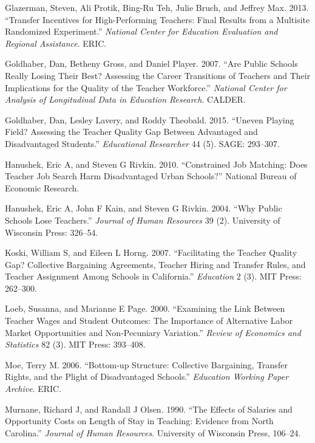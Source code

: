 \documentclass[]{article}
\begin{document}
\hypertarget{ref-glazerman}{}
Glazerman, Steven, Ali Protik, Bing-Ru Teh, Julie Bruch, and Jeffrey
Max. 2013. ``Transfer Incentives for High-Performing Teachers: Final
Results from a Multisite Randomized Experiment.'' \emph{National Center
for Education Evaluation and Regional Assistance}. ERIC.

\hypertarget{ref-goldhaber2007}{}
Goldhaber, Dan, Betheny Gross, and Daniel Player. 2007. ``Are Public
Schools Really Losing Their Best? Assessing the Career Transitions of
Teachers and Their Implications for the Quality of the Teacher
Workforce.'' \emph{National Center for Analysis of Longitudinal Data in
Education Research}. CALDER.

\hypertarget{ref-goldhaber2015}{}
Goldhaber, Dan, Lesley Lavery, and Roddy Theobald. 2015. ``Uneven
Playing Field? Assessing the Teacher Quality Gap Between Advantaged and
Disadvantaged Students.'' \emph{Educational Researcher} 44 (5). SAGE:
293--307.

\hypertarget{ref-hanushek2010}{}
Hanushek, Eric A, and Steven G Rivkin. 2010. ``Constrained Job Matching:
Does Teacher Job Search Harm Disadvantaged Urban Schools?'' National
Bureau of Economic Research.

\hypertarget{ref-hanushek}{}
Hanushek, Eric A, John F Kain, and Steven G Rivkin. 2004. ``Why Public
Schools Lose Teachers.'' \emph{Journal of Human Resources} 39 (2).
University of Wisconsin Press: 326--54.

\hypertarget{ref-koski}{}
Koski, William S, and Eileen L Horng. 2007. ``Facilitating the Teacher
Quality Gap? Collective Bargaining Agreements, Teacher Hiring and
Transfer Rules, and Teacher Assignment Among Schools in California.''
\emph{Education} 2 (3). MIT Press: 262--300.

\hypertarget{ref-loeb}{}
Loeb, Susanna, and Marianne E Page. 2000. ``Examining the Link Between
Teacher Wages and Student Outcomes: The Importance of Alternative Labor
Market Opportunities and Non-Pecuniary Variation.'' \emph{Review of
Economics and Statistics} 82 (3). MIT Press: 393--408.

\hypertarget{ref-moe}{}
Moe, Terry M. 2006. ``Bottom-up Structure: Collective Bargaining,
Transfer Rights, and the Plight of Disadvantaged Schools.''
\emph{Education Working Paper Archive}. ERIC.

\hypertarget{ref-murnane}{}
Murnane, Richard J, and Randall J Olsen. 1990. ``The Effects of Salaries
and Opportunity Costs on Length of Stay in Teaching: Evidence from North
Carolina.'' \emph{Journal of Human Resources}. University of Wisconsin
Press, 106--24.
\end{document}
